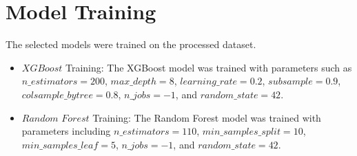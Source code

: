\documentclass{article}
\begin{document}
\section{Model Training}
The selected models were trained on the processed dataset.

\begin{itemize}
    \item $XGBoost$ Training: The XGBoost model was trained with parameters such as $n\_estimators=200$, $max\_depth=8$, $learning\_rate=0.2$, $subsample=0.9$, $colsample\_bytree=0.8$, $n\_jobs=-1$, and $random\_state=42$.
    \item $Random$ $Forest$ Training: The Random Forest model was trained with parameters including $n\_estimators=110$, $min\_samples\_split=10$, $min\_samples\_leaf=5$, $n\_jobs=-1$, and $random\_state=42$.
\end{itemize}
\end{document}
